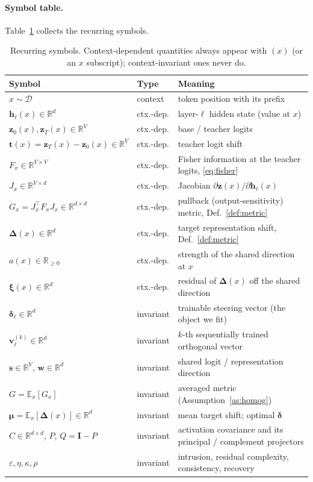 \documentclass[11pt]{article}
\newcommand{\R}{\mathbb{R}}
\newcommand{\E}{\mathbb{E}}
\newcommand{\bh}{\mathbf{h}}
\newcommand{\bz}{\mathbf{z}}
\newcommand{\bt}{\mathbf{t}}
\newcommand{\bs}{\mathbf{s}}
\newcommand{\bv}{\mathbf{v}}
\newcommand{\bw}{\mathbf{w}}
\newcommand{\bI}{\mathbf{I}}
\newcommand{\bdelta}{\bm{\delta}}
\newcommand{\bDelta}{\bm{\Delta}}
\newcommand{\bmu}{\bm{\mu}}
\newcommand{\bxi}{\bm{\xi}}
\begin{document}
\paragraph{Symbol table.} Table~\ref{tab:notation} collects the recurring symbols.
\begin{table}[h]
\centering\small
\renewcommand{\arraystretch}{1.25}
\begin{tabularx}{\textwidth}{@{}llX@{}}
\toprule
\textbf{Symbol} & \textbf{Type} & \textbf{Meaning} \\
\midrule
$x\sim\mathcal D$ & context & token position with its prefix \\
$\bh_\ell(x)\in\R^d$ & ctx.-dep. & layer-$\ell$ hidden state (value at $x$) \\
$\bz_0(x),\bz_T(x)\in\R^V$ & ctx.-dep. & base / teacher logits \\
$\bt(x)=\bz_T(x)-\bz_0(x)\in\R^V$ & ctx.-dep. & teacher logit shift \\
$F_x\in\R^{V\times V}$ & ctx.-dep. & Fisher information at the teacher logits, \eqref{eq:fisher} \\
$J_x\in\R^{V\times d}$ & ctx.-dep. & Jacobian $\partial\bz(x)/\partial\bh_\ell(x)$ \\
$G_x=J_x^\top F_xJ_x\in\R^{d\times d}$ & ctx.-dep. & pullback (output-sensitivity) metric, Def.~\ref{def:metric} \\
$\bDelta(x)\in\R^d$ & ctx.-dep. & target representation shift, Def.~\ref{def:metric} \\
$a(x)\in\R_{\ge0}$ & ctx.-dep. & strength of the shared direction at $x$ \\
$\bxi(x)\in\R^d$ & ctx.-dep. & residual of $\bDelta(x)$ off the shared direction \\
\midrule
$\bdelta_\ell\in\R^d$ & invariant & trainable steering vector (the object we fit) \\
$\bv_\ell^{(k)}\in\R^d$ & invariant & $k$-th sequentially trained orthogonal vector \\
$\bs\in\R^V$, $\bw\in\R^d$ & invariant & shared logit / representation direction \\
$G=\E_x[G_x]$ & invariant & averaged metric (Assumption~\ref{as:homog}) \\
$\bmu=\E_x[\bDelta(x)]\in\R^d$ & invariant & mean target shift; optimal $\bdelta$ \\
$C\in\R^{d\times d}$, $P$, $Q=\bI-P$ & invariant & activation covariance and its principal / complement projectors \\
$\varepsilon,\eta,\kappa,\rho$ & invariant & intrusion, residual complexity, consistency, recovery \\
\bottomrule
\end{tabularx}
\caption{Recurring symbols. Context-dependent quantities always appear with $(x)$ (or an $x$
subscript); context-invariant ones never do.}
\label{tab:notation}
\end{table}
\end{document}
